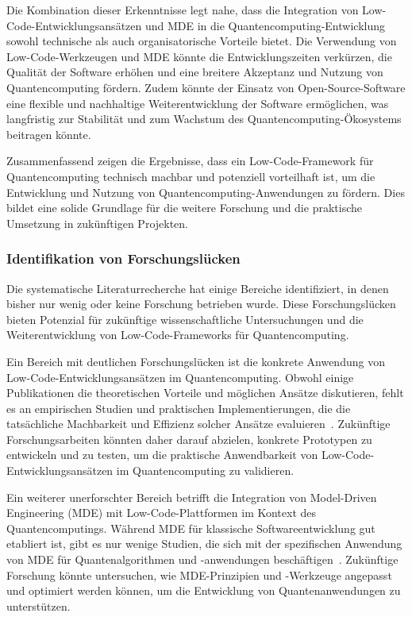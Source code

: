 Die Kombination dieser Erkenntnisse legt nahe, dass die Integration von Low-Code-Entwicklungsansätzen und MDE in 
die Quantencomputing-Entwicklung sowohl technische als auch organisatorische Vorteile bietet. Die Verwendung von 
Low-Code-Werkzeugen und MDE könnte die Entwicklungszeiten verkürzen, die Qualität der Software erhöhen und eine breitere 
Akzeptanz und Nutzung von Quantencomputing fördern. Zudem könnte der Einsatz von Open-Source-Software eine flexible 
und nachhaltige Weiterentwicklung der Software ermöglichen, was langfristig zur Stabilität und zum Wachstum des 
Quantencomputing-Ökosystems beitragen könnte.

Zusammenfassend zeigen die Ergebnisse, dass ein Low-Code-Framework für Quantencomputing technisch machbar und 
potenziell vorteilhaft ist, um die Entwicklung und Nutzung von Quantencomputing-Anwendungen zu fördern. Dies bildet 
eine solide Grundlage für die weitere Forschung und die praktische Umsetzung in zukünftigen Projekten.

\subsubsection{Identifikation von Forschungslücken}

Die systematische Literaturrecherche hat einige Bereiche identifiziert, in denen bisher nur wenig oder keine Forschung 
betrieben wurde. Diese Forschungslücken bieten Potenzial für zukünftige wissenschaftliche Untersuchungen und 
die Weiterentwicklung von Low-Code-Frameworks für Quantencomputing.

Ein Bereich mit deutlichen Forschungslücken ist die konkrete Anwendung von Low-Code-Entwicklungsansätzen im 
Quantencomputing. Obwohl einige Publikationen die theoretischen Vorteile und möglichen Ansätze diskutieren, 
fehlt es an empirischen Studien und praktischen Implementierungen, die die tatsächliche Machbarkeit und Effizienz 
solcher Ansätze evaluieren~\cite{Perez-Delgado_2020, Gemeinhardt_2021}. Zukünftige Forschungsarbeiten könnten daher 
darauf abzielen, konkrete Prototypen zu entwickeln und zu testen, um die praktische Anwendbarkeit von 
Low-Code-Entwicklungsansätzen im Quantencomputing zu validieren.

Ein weiterer unerforschter Bereich betrifft die Integration von Model-Driven Engineering (MDE) mit Low-Code-Plattformen 
im Kontext des Quantencomputings. Während MDE für klassische Softwareentwicklung gut etabliert ist, gibt es nur wenige 
Studien, die sich mit der spezifischen Anwendung von MDE für Quantenalgorithmen und -anwendungen 
beschäftigen~\cite{Gemeinhardt_2023, Perez-Castillo_2022}. Zukünftige Forschung könnte untersuchen, wie MDE-Prinzipien 
und -Werkzeuge angepasst und optimiert werden können, um die Entwicklung von Quantenanwendungen zu unterstützen.

